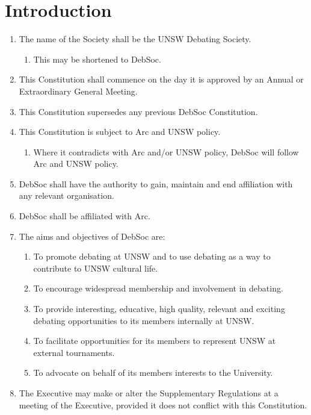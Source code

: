 \newpage
\section{Introduction}

\begin{enumerate}
    \item The name of the Society shall be the UNSW Debating Society.
    \begin{enumerate}
        \item This may be shortened to DebSoc.
    \end{enumerate}
    \item This Constitution shall commence on the day it is approved by an Annual or Extraordinary General Meeting.
    \item This Constitution supersedes any previous DebSoc Constitution.
    \item This Constitution is subject to Arc and UNSW policy.
    \begin{enumerate}
        \item Where it contradicts with Arc and/or UNSW policy, DebSoc will follow Arc and UNSW policy.
    \end{enumerate}
    \item DebSoc shall have the authority to gain, maintain and end affiliation with any relevant organisation.
    \item DebSoc shall be affiliated with Arc.
    \item The aims and objectives of DebSoc are: \label{debsoc_aims}
    \begin{enumerate}
        \item To promote debating at UNSW and to use debating as a way to contribute to UNSW cultural life.
        \item To encourage widespread membership and involvement in debating.
        \item To provide interesting, educative, high quality, relevant and exciting debating opportunities to its members internally at UNSW.
        \item To facilitate opportunities for its members to represent UNSW at external tournaments.
        \item To advocate on behalf of its members interests to the University.
    \end{enumerate}
    \item The Executive may make or alter the Supplementary Regulations at a meeting of the Executive, provided it does not conflict with this Constitution.

\end{enumerate}
